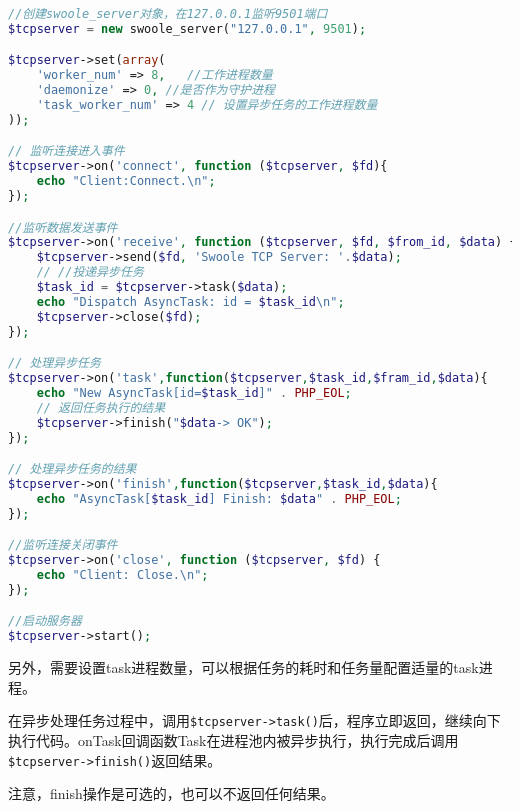 \begin{lstlisting}[language=PHP]
//创建swoole_server对象，在127.0.0.1监听9501端口
$tcpserver = new swoole_server("127.0.0.1", 9501);

$tcpserver->set(array(
    'worker_num' => 8,   //工作进程数量
    'daemonize' => 0, //是否作为守护进程
    'task_worker_num' => 4 // 设置异步任务的工作进程数量
));

// 监听连接进入事件
$tcpserver->on('connect', function ($tcpserver, $fd){
    echo "Client:Connect.\n";
});

//监听数据发送事件
$tcpserver->on('receive', function ($tcpserver, $fd, $from_id, $data) {
    $tcpserver->send($fd, 'Swoole TCP Server: '.$data);
    // //投递异步任务
    $task_id = $tcpserver->task($data);
    echo "Dispatch AsyncTask: id = $task_id\n";
    $tcpserver->close($fd);
});

// 处理异步任务
$tcpserver->on('task',function($tcpserver,$task_id,$fram_id,$data){
	echo "New AsyncTask[id=$task_id]" . PHP_EOL;
	// 返回任务执行的结果
	$tcpserver->finish("$data-> OK");
});

// 处理异步任务的结果
$tcpserver->on('finish',function($tcpserver,$task_id,$data){
	echo "AsyncTask[$task_id] Finish: $data" . PHP_EOL;
});

//监听连接关闭事件
$tcpserver->on('close', function ($tcpserver, $fd) {
    echo "Client: Close.\n";
});

//启动服务器
$tcpserver->start();
\end{lstlisting}


另外，需要设置task进程数量，可以根据任务的耗时和任务量配置适量的task进程。


在异步处理任务过程中，调用\texttt{\$tcpserver->task()}后，程序立即返回，继续向下执行代码。onTask回调函数Task在进程池内被异步执行，执行完成后调用\texttt{\$tcpserver->finish()}返回结果。

注意，finish操作是可选的，也可以不返回任何结果。



